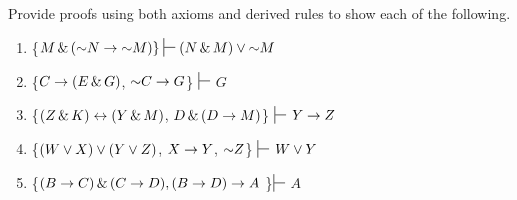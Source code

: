 \noindent\problempart
Provide proofs using both axioms and derived rules to show each of the following.
\begin{enumerate}[label=(\arabic*)]
\item \{$M \eand (\enot N \eif \enot M) \} \sststile{}{} (N \eand M) \eor \enot M$




\item \{$C\rightarrow(E\,\&\, G)$, $\mathord{\sim} C \rightarrow G$\} $\sststile{}{}$ $G$
\item \{$(Z\,\&\, K)\leftrightarrow(Y\,\&\, M)$, $D\,\&\,(D\rightarrow M)$\} $\sststile{}{}$ $Y\rightarrow Z$




\item \{$(W \vee X) \vee (Y \vee Z)$, $X\rightarrow Y$, $\mathord{\sim} Z$\} $\sststile{}{}$ $W\vee Y$
\item \{$(B \rightarrow C) \,\&\, (C \rightarrow D), (B \rightarrow D) \rightarrow A $ \}$ \sststile{}{}$ $A$



\end{enumerate}

